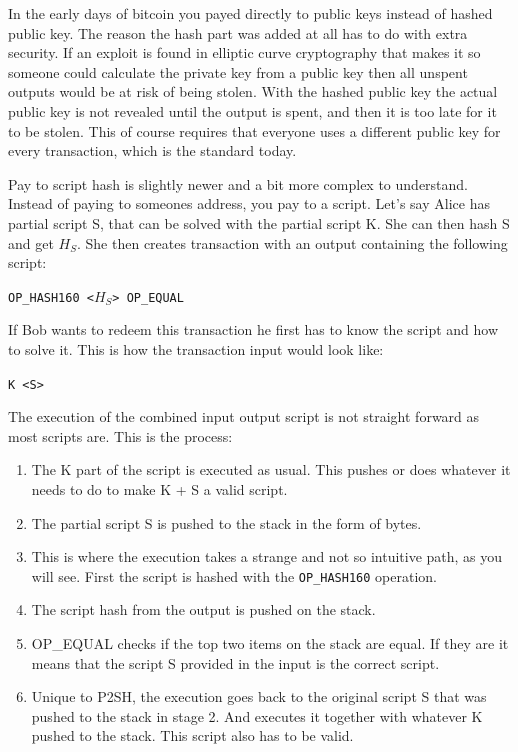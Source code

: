 In the early days of bitcoin you payed directly to public keys instead of hashed public key. The reason the hash part was added at all has to do with extra security. If an exploit is found in elliptic curve cryptography that makes it so someone could calculate the private key from a public key then all unspent outputs would be at risk of being stolen. With the hashed public key the actual public key is not revealed until the output is spent, and then it is too late for it to be stolen. This of course requires that everyone uses a different public key for every transaction, which is the standard today.

Pay to script hash is slightly newer and a bit more complex to understand. Instead of paying to someones address, you pay to a script. Let's say Alice has partial script S, that can be solved with the partial script K. She can then hash S and get $H_S$. She then creates transaction with an output containing the following script:

\texttt{OP\_HASH160 <$H_S$> OP\_EQUAL}

If Bob wants to redeem this transaction he first has to know the script and how to solve it. This is how the transaction input would look like: 

\texttt{K <S>}

The execution of the combined input output script is not straight forward as most scripts are. This is the process:
\begin{enumerate}
	\item The K part of the script is executed as usual. This pushes or does whatever it needs to do to make K + S a valid script.
	\item The partial script S is pushed to the stack in the form of bytes.
	\item This is where the execution takes a strange and not so intuitive path, as you will see. First the script is hashed with the \texttt{OP\_HASH160} operation.
	\item The script hash from the output is pushed on the stack.
	\item OP\_EQUAL checks if the top two items on the stack are equal. If they are it means that the script S provided in the input is the correct script.
	\item Unique to P2SH, the execution goes back to the original script S that was pushed to the stack in stage 2. And executes it together with whatever K pushed to the stack. This script also has to be valid. 
\end{enumerate}

